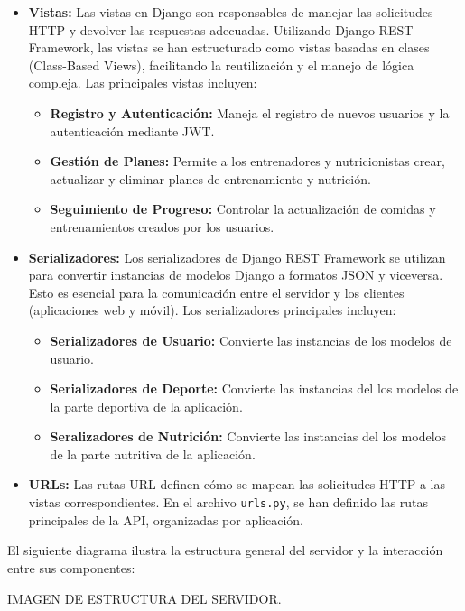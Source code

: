 \begin{itemize}
    \item \textbf{Vistas:} Las vistas en Django son responsables de manejar las solicitudes HTTP y devolver las respuestas adecuadas. Utilizando Django REST Framework, las vistas se han estructurado como vistas basadas en clases (Class-Based Views), facilitando la reutilización y el manejo de lógica compleja. Las principales vistas incluyen:
    \begin{itemize}
        \item \textbf{Registro y Autenticación:} Maneja el registro de nuevos usuarios y la autenticación mediante JWT.
        \item \textbf{Gestión de Planes:} Permite a los entrenadores y nutricionistas crear, actualizar y eliminar planes de entrenamiento y nutrición.
        \item \textbf{Seguimiento de Progreso:} Controlar la actualización de comidas y entrenamientos creados por los usuarios.
    \end{itemize}

    \item \textbf{Serializadores:} Los serializadores de Django REST Framework se utilizan para convertir instancias de modelos Django a formatos JSON y viceversa. Esto es esencial para la comunicación entre el servidor y los clientes (aplicaciones web y móvil). Los serializadores principales incluyen:
    \begin{itemize}
        \item \textbf{Serializadores de Usuario:} Convierte las instancias de los modelos de usuario.
        \item \textbf{Serializadores de Deporte:} Convierte las instancias del los modelos de la parte deportiva de la aplicación.
        \item \textbf{Seralizadores de Nutrición:} Convierte las instancias del los modelos de la parte nutritiva de la aplicación.
    \end{itemize}

    \item \textbf{URLs:} Las rutas URL definen cómo se mapean las solicitudes HTTP a las vistas correspondientes. En el archivo \texttt{urls.py}, se han definido las rutas principales de la API, organizadas por aplicación.
\end{itemize}

El siguiente diagrama ilustra la estructura general del servidor y la interacción entre sus componentes:

IMAGEN DE ESTRUCTURA DEL SERVIDOR.